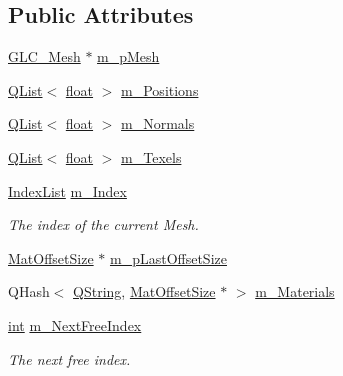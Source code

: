 \subsection*{Public Attributes}
\begin{DoxyCompactItemize}
\item 
\hyperlink{class_g_l_c___mesh}{G\-L\-C\-\_\-\-Mesh} $\ast$ \hyperlink{struct_g_l_c___obj_to_world_1_1_current_obj_mesh_a487f1411f369e3b2d7e36db3b45519da}{m\-\_\-p\-Mesh}
\item 
\hyperlink{class_q_list}{Q\-List}$<$ \hyperlink{_super_l_u_support_8h_a6a1bb6ed41f44b60e7bd83b0e9945aa7}{float} $>$ \hyperlink{struct_g_l_c___obj_to_world_1_1_current_obj_mesh_a8e8debf639dcf41ab629fe2fe15855e9}{m\-\_\-\-Positions}
\item 
\hyperlink{class_q_list}{Q\-List}$<$ \hyperlink{_super_l_u_support_8h_a6a1bb6ed41f44b60e7bd83b0e9945aa7}{float} $>$ \hyperlink{struct_g_l_c___obj_to_world_1_1_current_obj_mesh_a471a42e6442c4ea2bc20c64e5949e436}{m\-\_\-\-Normals}
\item 
\hyperlink{class_q_list}{Q\-List}$<$ \hyperlink{_super_l_u_support_8h_a6a1bb6ed41f44b60e7bd83b0e9945aa7}{float} $>$ \hyperlink{struct_g_l_c___obj_to_world_1_1_current_obj_mesh_a8a7ddd5879c2f6b4d32001297611e159}{m\-\_\-\-Texels}
\item 
\hyperlink{glc__global_8h_a92568854751d0cfbc27eae9c76aab7cf}{Index\-List} \hyperlink{struct_g_l_c___obj_to_world_1_1_current_obj_mesh_a7983de26eaf5415293d2410a9c4b0f4f}{m\-\_\-\-Index}
\begin{DoxyCompactList}\small\item\em The index of the current Mesh. \end{DoxyCompactList}\item 
\hyperlink{struct_g_l_c___obj_to_world_1_1_mat_offset_size}{Mat\-Offset\-Size} $\ast$ \hyperlink{struct_g_l_c___obj_to_world_1_1_current_obj_mesh_a6a252d308844ef55b455c425db8d941d}{m\-\_\-p\-Last\-Offset\-Size}
\item 
Q\-Hash$<$ \hyperlink{group___u_a_v_objects_plugin_gab9d252f49c333c94a72f97ce3105a32d}{Q\-String}, \hyperlink{struct_g_l_c___obj_to_world_1_1_mat_offset_size}{Mat\-Offset\-Size} $\ast$ $>$ \hyperlink{struct_g_l_c___obj_to_world_1_1_current_obj_mesh_a05bd61a0e440ca2fb41aa0e18b8f4f05}{m\-\_\-\-Materials}
\item 
\hyperlink{ioapi_8h_a787fa3cf048117ba7123753c1e74fcd6}{int} \hyperlink{struct_g_l_c___obj_to_world_1_1_current_obj_mesh_a5a64c9e796da66ce9d1e4acd62ffec3e}{m\-\_\-\-Next\-Free\-Index}
\begin{DoxyCompactList}\small\item\em The next free index. \end{DoxyCompactList}\item 

\end{DoxyCompactItemize}
